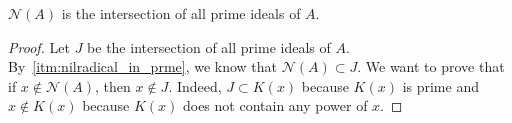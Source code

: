 \begin{problem}
\begin{enumerate}[label=(\theproblem.\arabic*),ref=\theproblem.\arabic*]
\begin{sol}
                \begin{claim} $\mathcal{N}(A)$ is the intersection of all prime ideals of $A$.
                    \begin{proof}
                        Let $J$ be the intersection of all prime ideals of $A$.
                        By~\ref{itm:nilradical_in_prme}, we know that $\mathcal{N}(A) \subset J$.
                        We want to prove that if  $x \notin \mathcal{N}(A)$, then $x \notin J$.
                        Indeed, $J \subset K(x)$ because $K(x)$ is prime and $x \notin K(x)$ because $K(x)$ does not contain any power of $x$.
                    \end{proof}
                \end{claim}

            \end{sol}
    \end{enumerate}
\end{problem}